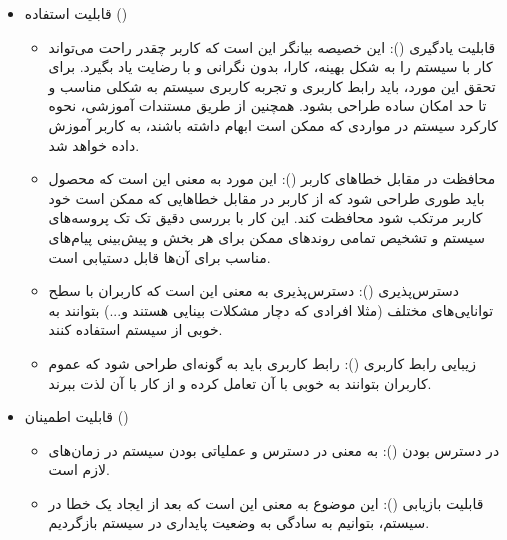 {\begin{enumerate}[a)]
\begin{itemize}
\begin{itemize}
		\end{itemize}
		
		\item
		قابلیت استفاده ()
		
		\begin{itemize}
			
			\item 
			قابلیت یادگیری (): این خصیصه بیانگر این است که کاربر چقدر راحت می‌تواند کار با سیستم را به شکل بهینه، کارا، بدون نگرانی و با رضایت یاد بگیرد. برای تحقق این مورد، باید رابط کاربری و تجربه کاربری سیستم به شکلی مناسب و تا حد امکان ساده طراحی بشود. همچنین از طریق مستندات آموزشی، نحوه کارکرد سیستم در مواردی که ممکن است ابهام داشته باشند، به کاربر آموزش داده خواهد شد.
			
			\item
			محافظت در مقابل خطاهای کاربر (): این مورد به معنی این است که محصول باید طوری طراحی شود که از کاربر در مقابل خطاهایی که ممکن است خود کاربر مرتکب شود محافظت کند. این کار با بررسی دقیق تک تک پروسه‌های سیستم و تشخیص تمامی روندهای ممکن برای هر بخش و پیش‌بینی پیام‌های مناسب برای آن‌ها قابل دستیابی است.
			
			\item 
			دسترس‌پذیری (): دسترس‌‌پذیری به معنی این است که کاربران با سطح توانایی‌های مختلف (مثلا افرادی که دچار مشکلات بینایی هستند و...) بتوانند به خوبی از سیستم استفاده کنند.
			
			
			\item 
			زیبایی رابط کاربری (): رابط کاربری باید به گونه‌ای طراحی شود که عموم کاربران بتوانند به خوبی با آن تعامل کرده و از کار با آن لذت ببرند. 
			
			
		\end{itemize}
		
		
		\item
		قابلیت اطمینان ()
		
		\begin{itemize}
			\item 
			
			در دسترس بودن (): به معنی در دسترس و عملیاتی بودن سیستم در زمان‌های لازم است.
			
			\item
			قابلیت بازیابی (): این موضوع به معنی این است که بعد از ایجاد یک خطا در سیستم، بتوانیم به سادگی به وضعیت پایداری در سیستم بازگردیم.
		\end{itemize}
		

\end{itemize}
\end{enumerate}}

